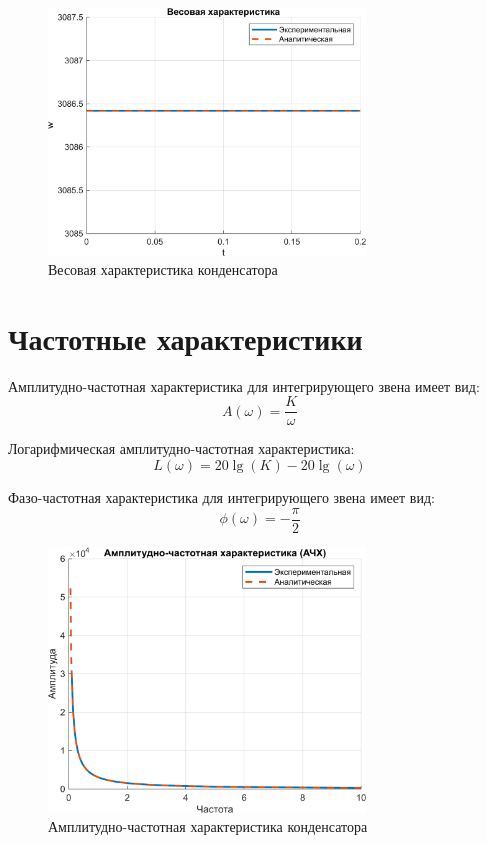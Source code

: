 \begin{figure}[H]
    \centering
    \includegraphics[width=0.75\textwidth, trim={0cm 0cm 0cm 0cm}]{../images/3_2.png}
    \caption{Весовая характеристика конденсатора}
\end{figure}

\section{Частотные характеристики}

Амплитудно-частотная характеристика для интегрирующего звена имеет вид:
\[
    A(\omega) = \frac{K}{\omega}
\]

Логарифмическая амплитудно-частотная характеристика:
\[
    L(\omega) = 20 \lg(K) - 20 \lg(\omega)
\]

Фазо-частотная характеристика для интегрирующего звена имеет вид:
\[
    \phi(\omega) = -\frac{\pi}{2}
\]

\begin{figure}[H]
    \centering
    \includegraphics[width=0.75\textwidth, trim={0cm 0cm 0cm 0cm}]{../images/3_3.png}
    \caption{Амплитудно-частотная характеристика конденсатора}
\end{figure}

